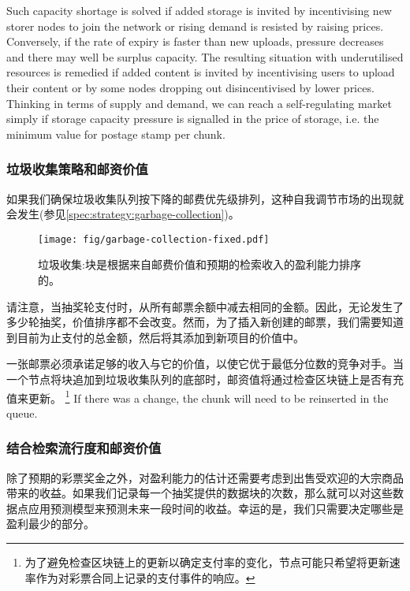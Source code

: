 Such capacity shortage is solved if added storage is invited by incentivising new storer nodes to join the network or rising demand is resisted by raising prices. Conversely, if the rate of expiry is faster than new uploads, pressure decreases and there may well be surplus capacity. The resulting situation with underutilised resources is remedied if added content is invited by incentivising users to upload their content or by some nodes dropping out disincentivised by lower prices. Thinking in terms of supply and demand, we can reach a self-regulating market simply if storage capacity pressure is signalled in the price of storage, i.e. the minimum value for postage stamp per chunk. 

\subsubsection{垃圾收集策略和邮资价值}

如果我们确保垃圾收集队列按下降的邮费优先级排列，这种自我调节市场的出现就会发生(参见\ref{spec:strategy:garbage-collection})。

\begin{figure}[htbp]
  \centering
  \texttt{[image: fig/garbage-collection-fixed.pdf]}
  \caption[垃圾收集\statusgreen]{垃圾收集:块是根据来自邮费价值和预期的检索收入的盈利能力排序的。}
  \label{fig:garbage-collection}
\end{figure}


请注意，当抽奖轮支付时，从所有邮票余额中减去相同的金额。因此，无论发生了多少轮抽奖，价值排序都不会改变。然而，为了插入新创建的邮票，我们需要知道到目前为止支付的总金额，然后将其添加到新项目的价值中。

一张邮票必须承诺足够的收入与它的价值，以使它优于最低分位数的竞争对手。当一个节点将块追加到垃圾收集队列的底部时，邮资值将通过检查区块链上是否有充值来更新。%
%
\footnote{为了避免检查区块链上的更新以确定支付率的变化，节点可能只希望将更新速率作为对彩票合同上记录的支付事件的响应。}
%
If there was a change, the chunk will need to be reinserted in the queue. 

\subsubsection{结合检索流行度和邮资价值}

除了预期的彩票奖金之外，对盈利能力的估计还需要考虑到出售受欢迎的大宗商品带来的收益。如果我们记录每一个抽奖提供的数据块的次数，那么就可以对这些数据点应用预测模型来预测未来一段时间的收益。幸运的是，我们只需要决定哪些是盈利最少的部分。 

